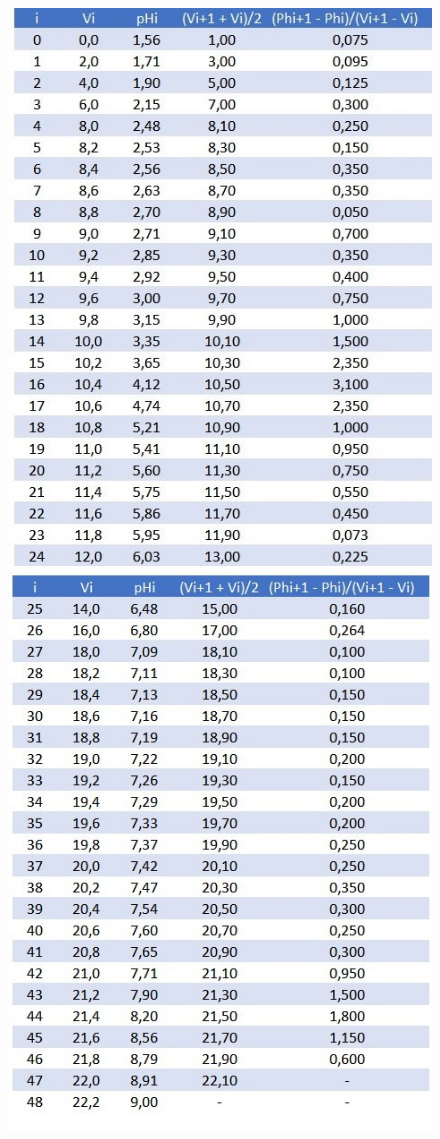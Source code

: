 \begin{figure}[H]
    \centering
    \hspace*{-2.3cm}
        \includegraphics[scale = 0.75]{prac3/tabla31.jpg}
        \includegraphics[scale = 0.75]{prac3/tabla32.jpg}
    \hspace*{-2.3cm}
\end{figure}

